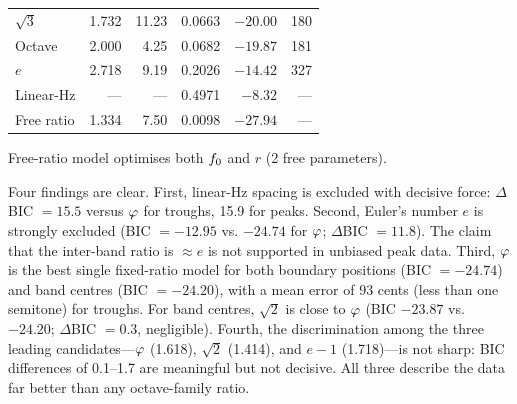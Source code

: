 \begin{table}[h]
\begin{threeparttable}
\begin{tabular}{l r r r r r}
$\sqrt{3}$ & 1.732 & 11.23 & 0.0663 & $-20.00$ & 180 \\
Octave    & 2.000 & 4.25 & 0.0682 & $-19.87$ & 181 \\
$e$       & 2.718 & 9.19 & 0.2026 & $-14.42$ & 327 \\
Linear-Hz & ---   & ---  & 0.4971 & $-8.32$  & --- \\
Free ratio\tnote{a} & 1.334 & 7.50 & 0.0098 & $-27.94$ & --- \\
\bottomrule
\end{tabular}
\begin{tablenotes}
\small
\item[a] Free-ratio model optimises both $f_0$ and $r$ (2 free parameters).
\end{tablenotes}
\end{threeparttable}
\end{table}

Four findings are clear. First, linear-Hz spacing is excluded with decisive force: $\Delta$BIC $= 15.5$ versus $\varphi$ for troughs, 15.9 for peaks. Second, Euler's number $e$ is strongly excluded (BIC $= -12.95$ vs. $-24.74$ for $\varphi$; $\Delta$BIC $= 11.8$). The \textcite{penttonen2003natural} claim that the inter-band ratio is $\approx e$ is not supported in unbiased peak data. Third, $\varphi$ is the best single fixed-ratio model for both boundary positions (BIC $= -24.74$) and band centres (BIC $= -24.20$), with a mean error of 93 cents (less than one semitone) for troughs. For band centres, $\sqrt{2}$ is close to $\varphi$ (BIC $-23.87$ vs. $-24.20$; $\Delta$BIC $= 0.3$, negligible). Fourth, the discrimination among the three leading candidates---$\varphi$ (1.618), $\sqrt{2}$ (1.414), and $e - 1$ (1.718)---is not sharp: BIC differences of 0.1--1.7 are meaningful but not decisive. All three describe the data far better than any octave-family ratio.

